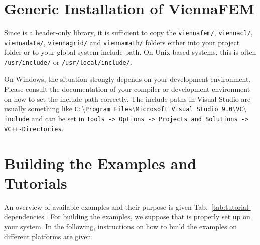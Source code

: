 \section{Generic Installation of ViennaFEM} \label{sec:viennafem-installation}
Since {\ViennaFEM} is a header-only library, it is sufficient to copy the
\lstinline|viennafem/|, \lstinline|viennacl/|, \lstinline|viennadata/|, \lstinline|viennagrid/| and \lstinline|viennamath/|
folders either into your project folder or to your global system
include path. On Unix based systems, this is often \lstinline|/usr/include/| or
\lstinline|/usr/local/include/|.

On Windows, the situation strongly depends on your development environment.
Please consult the documentation of your compiler or development environment on how to set the include
path correctly. The include paths in Visual Studio are usually something like
\texttt{C:$\setminus$Program Files$\setminus$Microsoft Visual Studio
9.0$\setminus$VC$\setminus$include}
and can be set in \texttt{Tools -> Options -> Projects and Solutions ->
VC++-\-Directories}.


\section{Building the Examples and Tutorials}
An overview of available examples and their purpose is given
Tab.~\ref{tab:tutorial-dependencies}.
For building the examples, we suppose that {\CMake} is properly set up
on your system. In the following, instructions on how to build the examples on different platforms are given.

